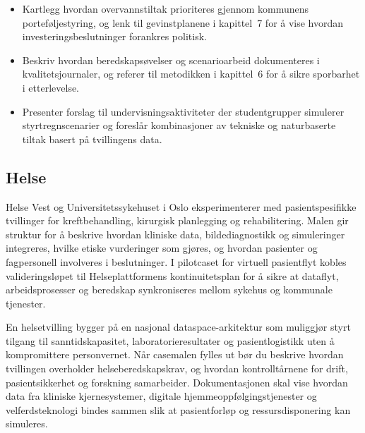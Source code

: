\begin{itemize}
    \item Kartlegg hvordan overvannstiltak prioriteres gjennom kommunens porteføljestyring, og lenk til gevinstplanene i kapittel~7 for å vise hvordan investeringsbeslutninger forankres politisk.
    \item Beskriv hvordan beredskapsøvelser og scenarioarbeid dokumenteres i kvalitetsjournaler, og referer til metodikken i kapittel~6 for å sikre sporbarhet i etterlevelse.
    \item Presenter forslag til undervisningsaktiviteter der studentgrupper simulerer styrtregnscenarier og foreslår kombinasjoner av tekniske og naturbaserte tiltak basert på tvillingens data.
\end{itemize}

\subsection*{Helse}
Helse Vest og Universitetssykehuset i Oslo eksperimenterer med pasientspesifikke tvillinger for kreftbehandling, kirurgisk planlegging og rehabilitering. Malen gir struktur for å beskrive hvordan kliniske data, bildediagnostikk og simuleringer integreres, hvilke etiske vurderinger som gjøres, og hvordan pasienter og fagpersonell involveres i beslutninger. I pilotcaset for virtuell pasientflyt kobles valideringsløpet til Helseplattformens kontinuitetsplan for å sikre at dataflyt, arbeidsprosesser og beredskap synkroniseres mellom sykehus og kommunale tjenester.\citep{helseplattformen2023kontinuitet}

En helsetvilling bygger på en nasjonal dataspace-arkitektur som muliggjør styrt tilgang til sanntidskapasitet, laboratorieresultater og pasientlogistikk uten å kompromittere personvernet.\citep{nhn2024dataspace} Når casemalen fylles ut bør du beskrive hvordan tvillingen overholder helseberedskapskrav, og hvordan kontrolltårnene for drift, pasientsikkerhet og forskning samarbeider.\citep{hod2020beredskap} Dokumentasjonen skal vise hvordan data fra kliniske kjernesystemer, digitale hjemmeoppfølgingstjenester og velferdsteknologi bindes sammen slik at pasientforløp og ressursdisponering kan simuleres.\citep{helsedir2020dho}

